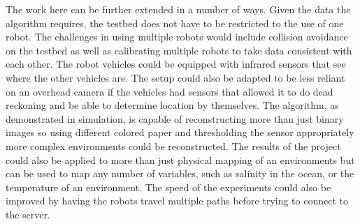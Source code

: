 \documentclass[english]{article}\usepackage[]{graphicx}\usepackage[]{color}
\begin{document}
The work here can be further extended in a number of ways. Given the data the algorithm requires, the testbed does not have to be restricted to the use of one robot. The challenges in using multiple robots would include collision avoidance on the testbed as well as calibrating multiple robots to take data consistent with each other. The robot vehicles could be equipped with infrared sensors that see where the other vehicles are. The setup could also be adapted to be less reliant on an overhead camera if the vehicles had sensors that allowed it to do dead reckoning and be able to determine location by themselves. The algorithm, as demonstrated in simulation, is capable of reconstructing more than just binary images so using different colored paper and thresholding the sensor appropriately more complex environments could be reconstructed. The results of the project could also be applied to more than just physical mapping of an environments but can be used to map any number of variables, such as salinity in the ocean, or the temperature of an environment. The speed of the experiments could also be improved by having the robots travel multiple paths before trying to connect to the server. 

\newpage


\nocite{*}
\end{document}

